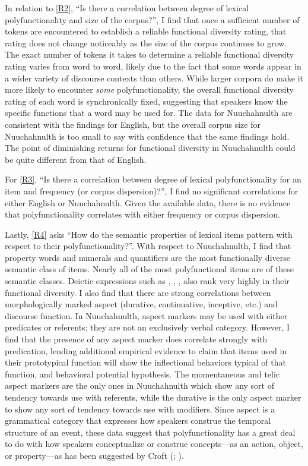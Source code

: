In relation to \ref{R2}, \enquote{Is there a correlation between degree of lexical polyfunctionality and size of the corpus?}, I find that once a sufficient number of tokens are encountered to establish a reliable functional diversity rating, that rating does not change noticeably as the size of the corpus continues to grow. The exact number of tokens it takes to determine a reliable functional diversity rating varies from word to word, likely due to the fact that some words appear in a wider variety of discourse contexts than others. While larger corpora do make it more likely to encounter \emph{some} polyfunctionality, the overall functional diversity rating of each word is synchronically fixed, suggesting that speakers know the specific functions that a word may be used for. The data for Nuuchahnulth are consistent with the findings for English, but the overall corpus size for Nuuchahnulth is too small to say with confidence that the same findings hold. The point of diminishing returns for functional diversity in Nuuchahnulth could be quite different from that of English.

For \ref{R3}, \enquote{Is there a correlation between degree of lexical polyfunctionality for an item and frequency (or corpus dispersion)?}, I find no significant correlations for either English or Nuuchahnulth. Given the available data, there is no evidence that polyfunctionality correlates with either frequency or corpus dispersion.

Lastly, \ref{R4} asks \enquote{How do the semantic properties of lexical items pattern with respect to their polyfunctionality?}. With respect to Nuuchahnulth, I find that property words and numerals and quantifiers are the most functionally diverse semantic class of items. Nearly all of the most polyfunctional items are of these semantic classes. Deictic expressions such as , , ,  also rank very highly in their functional diversity. I also find that there are strong correlations between morphologically marked aspect (durative, continuative, inceptive, etc.) and discourse function. In Nuuchahnulth, aspect markers may be used with either predicates or referents; they are not an exclusively verbal category. However, I find that the presence of any aspect marker does correlate strongly with predication, lending additional empirical evidence to  claim that items used in their prototypical function will show the inflectional behaviors typical of that function, and  behavioral potential hypothesis. The momentaneous and telic aspect markers are the only ones in Nuuchahnulth which show any sort of tendency towards use with referents, while the durative is the only aspect marker to show any sort of tendency towards use with modifiers. Since aspect is a grammatical category that expresses how speakers construe the temporal structure of an event, these data suggest that polyfunctionality has a great deal to do with how speakers conceptualize or construe concepts—as an action, object, or property—as has been suggested by Croft (\citeyear[99]{Croft1991}; \citeyear[104]{Croft2001b}).

